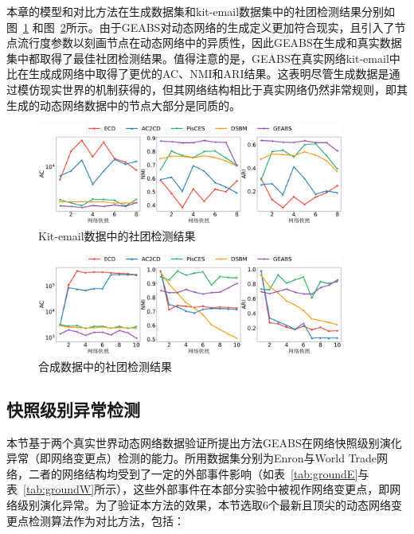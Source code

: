 本章的模型和对比方法在生成数据集和kit-email数据集中的社团检测结果分别如图~\ref{fig4:kit-email} 和图~\ref{fig4:mergesplitC}所示。由于GEABS对动态网络的生成定义更加符合现实，且引入了节点流行度参数以刻画节点在动态网络中的异质性，因此GEABS在生成和真实数据集中都取得了最佳社团检测结果。值得注意的是，GEABS在真实网络kit-email中比在生成成网络中取得了更优的AC、NMI和ARI结果。这表明尽管生成数据是通过模仿现实世界的机制获得的，但其网络结构相比于真实网络仍然非常规则，即其生成的动态网络数据中的节点大部分是同质的。

\begin{figure}
	\centering
	\includegraphics[width=0.9\textwidth]{figures/chap05/chap4Kit-emaili2Communitydetection.pdf}
	\caption{Kit-email数据中的社团检测结果}
	\label{fig4:kit-email}
\end{figure}
\begin{figure}
	\centering
	\includegraphics[width=0.9\textwidth]{figures/chap05/chap4mergesplitC.pdf}
	\caption{合成数据中的社团检测结果}
	\label{fig4:mergesplitC}
\end{figure}


 
 
\subsection{快照级别异常检测}

本节基于两个真实世界动态网络数据验证所提出方法GEABS在网络快照级别演化异常（即网络变更点）检测的能力。所用数据集分别为Enron与World Trade网络，二者的网络结构均受到了一定的外部事件影响（如表~\ref{tab:groundE}与表~\ref{tab:groundW}所示），这些外部事件在本部分实验中被视作网络变更点，即网络级别演化异常。为了验证本方法的效果，本节选取$6$个最新且顶尖的动态网络变更点检测算法作为对比方法，包括：

